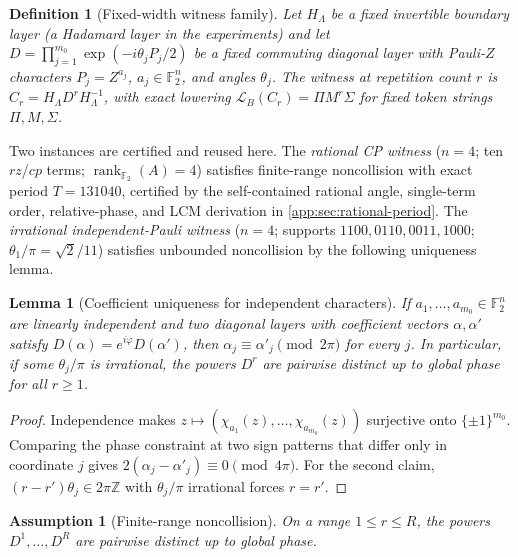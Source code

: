 \documentclass[aps,prx,reprint,floatfix,superscriptaddress]{revtex4-2}
\newtheorem{definition}{Definition}
\newtheorem{lemma}{Lemma}
\newtheorem{assumption}{Assumption}
\newcommand{\Ftwo}{\mathbb{F}_2}
\begin{document}
\begin{definition}[Fixed-width witness family]
\label{def:witness-family}
Let $H_\Lambda$ be a fixed invertible boundary layer (a Hadamard layer in
the experiments) and let
$D = \prod_{j=1}^{m_0} \exp(-i\theta_j P_j/2)$
be a fixed commuting diagonal layer with Pauli-$Z$ characters
$P_j = Z^{a_j}$, $a_j \in \Ftwo^{n}$, and angles $\theta_j$. The witness
at repetition count $r$ is $C_r = H_\Lambda D^{r} H_\Lambda^{-1}$, with
exact lowering $\mathcal{L}_B(C_r) = \Pi M^r \Sigma$ for fixed token
strings $\Pi, M, \Sigma$.
\end{definition}

Two instances are certified and reused here. The
\emph{rational CP witness} ($n = 4$; ten $rz$/$cp$ terms;
$\operatorname{rank}_{\Ftwo}(A) = 4$) satisfies finite-range noncollision
with exact period $T = 131040$, certified by the self-contained rational
angle, single-term order, relative-phase, and LCM derivation in
\cref{app:sec:rational-period}. The
\emph{irrational independent-Pauli witness} ($n = 4$; supports
$1100, 0110, 0011, 1000$; $\theta_1/\pi = \sqrt{2}/11$) satisfies
unbounded noncollision by the following uniqueness lemma.

\begin{lemma}[Coefficient uniqueness for independent characters]
\label{lem:coeff-uniqueness}
If $a_1,\ldots,a_{m_0} \in \Ftwo^{n}$ are linearly independent and two
diagonal layers with coefficient vectors $\alpha, \alpha'$ satisfy
$D(\alpha) = e^{i\varphi} D(\alpha')$, then
$\alpha_j \equiv \alpha'_j \pmod{2\pi}$ for every $j$. In particular, if
some $\theta_j/\pi$ is irrational, the powers $D^{r}$ are pairwise
distinct up to global phase for all $r \geq 1$.
\end{lemma}

\begin{proof}
Independence makes
$z \mapsto (\chi_{a_1}(z),\ldots,\chi_{a_{m_0}}(z))$ surjective onto
$\{\pm 1\}^{m_0}$. Comparing the phase constraint at two sign patterns
that differ only in coordinate $j$ gives
$2(\alpha_j - \alpha'_j) \equiv 0 \pmod{4\pi}$. For the second claim,
$(r-r')\theta_j \in 2\pi\mathbb{Z}$ with $\theta_j/\pi$ irrational forces
$r = r'$.
\end{proof}

\begin{assumption}[Finite-range noncollision]
\label{ass:noncollision}
On a range $1 \leq r \leq R$, the powers $D^1,\ldots,D^R$ are pairwise
distinct up to global phase.
\end{assumption}
\end{document}
